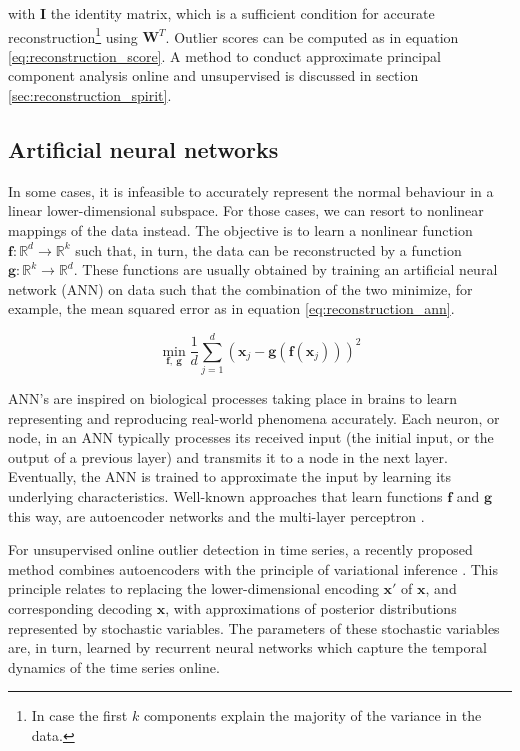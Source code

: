 \noindent with $\mathbf{I}$ the identity matrix, which is a sufficient condition for accurate reconstruction\footnote{In case the first $k$ components explain the majority of the variance in the data.} using $\mathbf{W}^T$. Outlier scores can be computed as in equation \eqref{eq:reconstruction_score}. A method to conduct approximate principal component analysis online and unsupervised is discussed in section \ref{sec:reconstruction_spirit}. 
 
\vspace{0.2cm}
\subsection{Artificial neural networks}
In some cases, it is infeasible to accurately represent the normal behaviour in a linear lower-dimensional subspace. For those cases, we can resort to nonlinear mappings of the data instead. The objective is to learn a nonlinear function $\mathbf{f} : \mathbb{R}^d \to \mathbb{R}^k$ such that, in turn, the data can be reconstructed by a function $\mathbf{g} : \mathbb{R}^k \to \mathbb{R}^d$. These functions are usually obtained by training an artificial neural network (ANN) on data such that the combination of the two minimize, for example, the mean squared error as in equation \eqref{eq:reconstruction_ann}. 

\begin{equation}\label{eq:reconstruction_ann}
\min_{\mathbf{f},\ \mathbf{g}}\frac{1}{d}\sum\limits_{j=1}^{d}(\mathbf{x}_{j} - \mathbf{g}(\mathbf{f}(\mathbf{x}_{j})))^2
\end{equation}

ANN's are inspired on biological processes taking place in brains to learn representing and reproducing real-world phenomena accurately. Each neuron, or node, in an ANN typically processes its received input (the initial input, or the output of a previous layer) and transmits it to a node in the next layer. Eventually, the ANN is trained to approximate the input by learning its underlying characteristics. Well-known approaches that learn functions $\mathbf{f}$ and $\mathbf{g}$ this way, are autoencoder networks \cite{japkowicz1995novelty} and the multi-layer perceptron \cite{nairac1999system}.

For unsupervised online outlier detection in time series, a recently proposed method combines autoencoders with the principle of variational inference \cite{solch2016variational}. This principle relates to replacing the lower-dimensional encoding $\mathbf{x}'$ of $\mathbf{x}$, and corresponding decoding $\hat{\mathbf{x}}$, with approximations of posterior distributions represented by stochastic variables. The parameters of these stochastic variables are, in turn, learned by recurrent neural networks which capture the temporal dynamics of the time series online.

